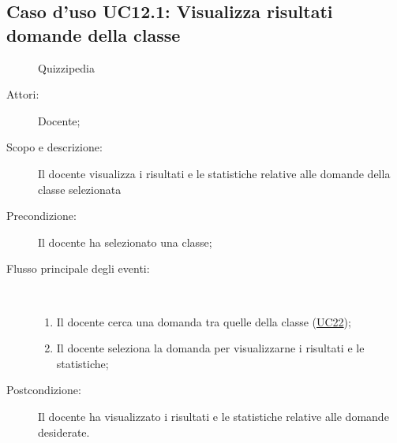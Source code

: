 \subsection{Caso d'uso UC12.1: Visualizza risultati domande della classe}
	\begin{figure}[H]
		\centering
		\begin{resizedtikzpicture}{\textwidth}
		\begin{umlsystem}[x=0, fill=lightgray!20]{Quizzipedia}
		\end{umlsystem}
		\end{resizedtikzpicture}
		\caption{}
	\end{figure}
\begin{description}
\item[Attori:] Docente;
\item[Scopo e descrizione:] Il docente visualizza i risultati e le statistiche relative alle domande della classe selezionata
      \item[Precondizione:] Il docente ha selezionato una classe;

        \item[Flusso principale degli eventi:] \ 
 \begin{enumerate}
          \item Il docente cerca una domanda tra quelle della classe (\hyperlink{UC22}{UC22});
          \item Il docente seleziona la domanda per visualizzarne i risultati e le statistiche;

      \end{enumerate}
    \item[Postcondizione:] Il docente ha visualizzato i risultati e le statistiche relative alle domande desiderate.
  \end{description}
\hypertarget{UC12.2}{}

